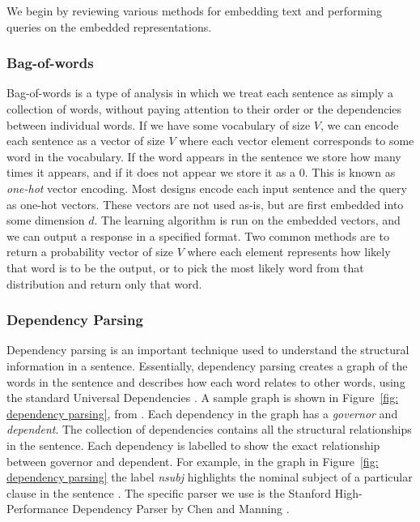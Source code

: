 \documentclass[pageno]{final_paper}
\begin{document}
We begin by reviewing various methods for embedding text and performing queries
on the embedded representations.

\subsubsection{Bag-of-words}
\label{Bag-of-words}

Bag-of-words is a type of analysis in which we treat each sentence as simply a
collection of words, without paying attention to their order or the dependencies
between individual words. If we have some vocabulary of size $V$, we can encode
each sentence as a vector of size $V$ where each vector element corresponds to
some word in the vocabulary. If the word appears in the sentence we store how
many times it appears, and if it does not appear we store it as a 0. This is
known as \textit{one-hot} vector encoding. Most designs encode each input
sentence and the query as one-hot vectors. These vectors are not used as-is, but
are first embedded into some dimension $d$. The learning algorithm is run on the
embedded vectors, and we can output a response in a specified format. Two common
methods are to return a probability vector of size $V$ where each element
represents how likely that word is to be the output, or to pick the most likely
word from that distribution and return only that word.

\subsubsection{Dependency Parsing}
\label{Dependency Parsing}

Dependency parsing is an important technique used to understand the structural
information in a sentence. Essentially, dependency parsing creates a graph of
the words in the sentence and describes how each word relates to other words,
using the standard Universal Dependencies \cite{De2014}. A sample graph is shown
in Figure~\ref{fig: dependency parsing}, from \cite{Chen2014}. Each dependency
in the graph has a \textit{governor} and \textit{dependent}. The collection of
dependencies contains all the structural relationships in the sentence. Each
dependency is labelled to show the exact relationship between governor and
dependent. For example, in the graph in Figure~\ref{fig: dependency parsing} the
label \textit{nsubj} highlights the nominal subject of a particular clause in
the sentence \cite{De2014}. The specific parser we use is the Stanford
High-Performance Dependency Parser by Chen and Manning \cite{Chen2014}.
\end{document}
